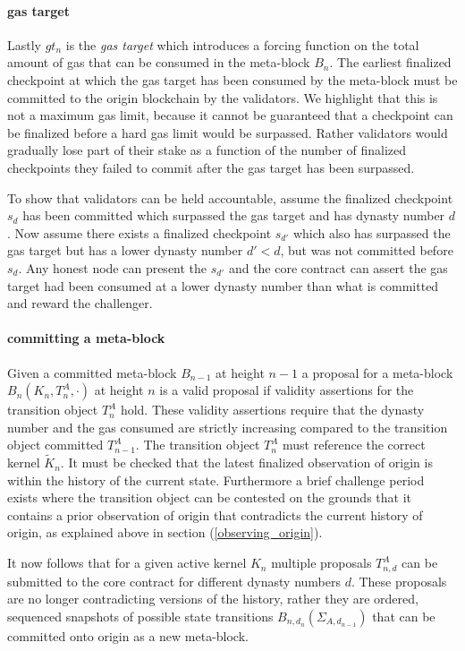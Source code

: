 \documentclass[12pt,a4paper]{article}
\begin{document}
\paragraph{gas target} Lastly $gt_n$ is the \emph{gas target} which introduces a forcing function on the total amount of gas that can be consumed in the meta-block $B_n$.
The earliest finalized checkpoint at which the gas target has been consumed by the meta-block must be committed to the origin blockchain by the validators.
We highlight that this is not a maximum gas limit, because it cannot be guaranteed that a checkpoint can be finalized before a hard gas limit would be surpassed. Rather validators would gradually lose part of their stake as a function of the number of finalized checkpoints they failed to commit after the gas target has been surpassed.

To show that validators can be held accountable, assume the finalized checkpoint $s_d$ has been committed which surpassed the gas target and has dynasty number $d$.
Now assume there exists a finalized checkpoint $s_{d'}$ which also has surpassed the gas target but has a lower dynasty number $d' < d$, but was not committed before $s_d$.
Any honest node can present the $s_{d'}$ and the core contract can assert the gas target had been consumed at a lower dynasty number than what is committed and reward the challenger.

\paragraph{committing a meta-block} Given a committed meta-block $B_{n-1}$ at height $n-1$ a proposal for a meta-block $B_{n}(K_{n}, T^A_{n}, \cdot)$ at height $n$ is a valid proposal if validity assertions for the transition object $T^A_n$ hold.  These validity assertions require that the dynasty number and the gas consumed are strictly increasing compared to the transition object committed $T^A_{n-1}$. The transition object $T^A_n$ must reference the correct kernel $\tilde{K}_n$. It must be checked that the latest finalized observation of origin is within the history of the current state. Furthermore  a brief challenge period exists where the transition object can be contested on the grounds that it contains a prior observation of origin that contradicts the current history of origin, as explained above in section (\ref{observing_origin}).

It now follows that for a given active kernel $K_n$ multiple proposals $T^{A}_{n,d}$ can be submitted to the core contract for different dynasty numbers $d$.  These proposals are no longer contradicting versions of the history, rather they are ordered, sequenced snapshots of possible state transitions $B_{n,d_{n}}(\Sigma_{A,d_{n-1}})$ that can be committed onto origin as a new meta-block.
\end{document}
